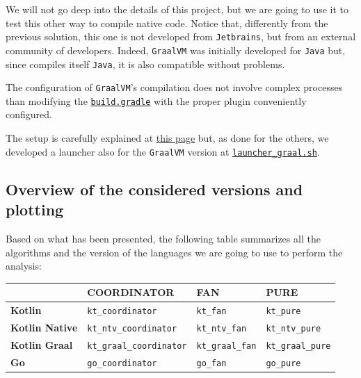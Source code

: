 We will not go deep into the details of this project, but we are going to use it to test this other way to compile native \Kotlin code. Notice that, differently from the previous solution, this one is not developed from \texttt{Jetbrains}, but from an external community of developers. Indeed, \texttt{GraalVM} was initially developed for \texttt{Java} but, since \Kotlin compiles itself \texttt{Java}, it is also compatible without problems.

The configuration of \texttt{GraalVM}'s compilation does not involve complex processes than modifying the \href{https://github.com/LM-96/Activity-Project-Operating-Systems-M-/blob/main/code/kotlin/unibo.apos.examples/build.gradle}{\texttt{build.gradle}} with the proper plugin conveniently configured.

The setup is carefully explained at \href{https://graalvm.github.io/native-build-tools/latest/gradle-plugin.html}{this page} but, as done for the others, we developed a launcher also for the \texttt{GraalVM} version at \href{https://github.com/LM-96/Activity-Project-Operating-Systems-M-/blob/main/code/launcher_graal.sh}{\texttt{launcher\_graal.sh}}.

\subsection{Overview of the considered versions and plotting}

Based on what has been presented, the following table summarizes all the algorithms and the version of the languages we are going to use to perform the analysis:

\begin{center}
	\begin{tabular}{|>{\raggedright\arraybackslash}p{3cm}|>{\raggedright\arraybackslash}p{4cm}|>{\raggedright\arraybackslash}p{3cm}|>{\raggedright\arraybackslash}p{3cm}|}
		\hline
		\textbf{} & \textbf{COORDINATOR} & \textbf{FAN} & \textbf{PURE} \\
		\hline
		\textbf{Kotlin} & \texttt{kt\_coordinator} & \texttt{kt\_fan} & \texttt{kt\_pure} \\
		\hline
		\textbf{Kotlin Native} & \texttt{kt\_ntv\_coordinator} & \texttt{kt\_ntv\_fan} & \texttt{kt\_ntv\_pure} \\
		\hline
		\textbf{Kotlin Graal} & \texttt{kt\_graal\_coordinator} & \texttt{kt\_graal\_fan} & \texttt{kt\_graal\_pure} \\
		\hline
		\textbf{Go} & \texttt{go\_coordinator} & \texttt{go\_fan} & \texttt{go\_pure} \\
		\hline
	\end{tabular}
\end{center}

